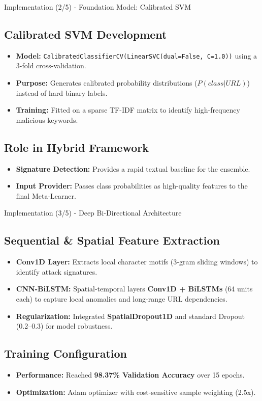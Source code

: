 \documentclass[aspectratio=169,xcolor=dvipsnames]{beamer}
\begin{document}
\begin{frame}{Implementation (2/5) - Foundation Model: Calibrated SVM}
\subsection{Calibrated SVM Development}
\begin{itemize}
    \item \textbf{Model:} \texttt{CalibratedClassifierCV(LinearSVC(dual=False, C=1.0))} using a 3-fold cross-validation.
    \item \textbf{Purpose:} Generates calibrated probability distributions ($P(class|URL)$) instead of hard binary labels.
    \item \textbf{Training:} Fitted on a sparse TF-IDF matrix to identify high-frequency malicious keywords.
\end{itemize}

\subsection{Role in Hybrid Framework}
\begin{itemize}
    \item \textbf{Signature Detection:} Provides a rapid textual baseline for the ensemble.
    \item \textbf{Input Provider:} Passes class probabilities as high-quality features to the final Meta-Learner.
\end{itemize}
\end{frame}

\begin{frame}{Implementation (3/5) - Deep Bi-Directional Architecture}
\subsection{Sequential & Spatial Feature Extraction}
\begin{itemize}
    \item \textbf{Conv1D Layer:} Extracts local character motifs (3-gram sliding windows) to identify attack signatures.
    \item \textbf{CNN-BiLSTM:} Spatial-temporal layers \textbf{Conv1D + BiLSTMs} (64 units each) to capture local anomalies and long-range URL dependencies.
    \item \textbf{Regularization:} Integrated \textbf{SpatialDropout1D} and standard Dropout (0.2--0.3) for model robustness.
\end{itemize}

\subsection{Training Configuration}
\begin{itemize}
    \item \textbf{Performance:} Reached \textbf{98.37\% Validation Accuracy} over 15 epochs.
    \item \textbf{Optimization:} Adam optimizer with cost-sensitive sample weighting (2.5x).
\end{itemize}
\end{frame}
\end{document}
